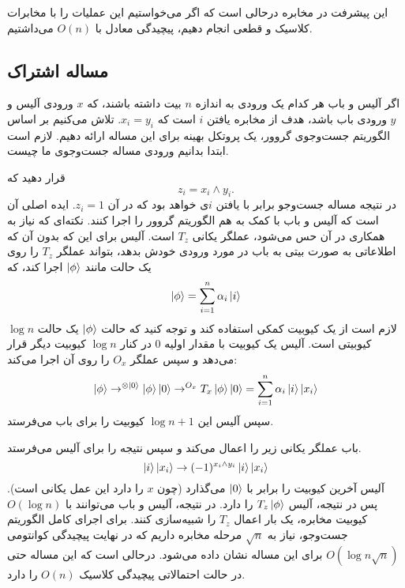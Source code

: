  این پیشرفت در مخابره درحالی است که اگر می‌خواستیم این عملیات را با مخابرات کلاسیک و قطعی انجام دهیم، پیچیدگی معادل با $O(n)$ می‌داشتیم. 
 
 
  \subsection{مساله اشتراک}

  اگر آلیس و باب هر کدام یک ورودی به اندازه $n$ بیت داشته باشند، که $x$ ورودی آلیس و $y$ ورودی باب باشد، هدف از مخابره یافتن $i$ است که $x_{i} = y_{i}$. تلاش می‌کنیم بر اساس الگوریتم جست‌وجوی گروور، یک پروتکل بهینه برای این مساله ارائه دهیم. 
  \cite{cleve98}
  لازم است ابتدا بدانیم ورودی مساله جست‌وجوی ما چیست.
  
    قرار دهید که 
  \begin{equation}
  	z_{i} = x_{i} \wedge y_{i}.
  \end{equation}
   در نتیجه مساله جست‌وجو برابر با یافتن $i$ی خواهد بود که در آن
    $z_{i} = 1$.
   ایده اصلی آن است که آلیس و باب با کمک به هم الگوریتم گروور را اجرا کنند. نکته‌ای که نیاز به همکاری در آن حس می‌شود، عملگر یکانی $T_{z}$ است. آلیس برای این که بدون آن که اطلاعاتی به صورت بیتی به باب در مورد ورودی خودش بدهد، بتواند عملگر $T_{z}$ را روی یک حالت مانند $\ket{\phi}$ اجرا کند، که 
    \begin{equation}
    	\ket{\phi} = \sum_{i=1}^{n} \alpha_{i}\ket{i}
    \end{equation}
    لازم است از یک کیوبیت کمکی استفاده کند و توجه کنید که حالت $\ket{\phi}$ یک حالت $\log{n}$ کیوبیتی است. آلیس یک کیوبیت با مقدار اولیه $0$ در کنار $\log{n}$ کیوبیت دیگر قرار می‌دهد و سپس عملگر $O_{x}$ را روی آن اجرا می‌کند:
    \begin{equation}
    \ket{\phi} \to^{ \otimes \ket{0}} \ket{\phi}\ket{0} \to^{O_{x}} T_{x}\ket{\phi}\ket{0} = \sum_{i=1}^{n} \alpha_{i}\ket{i}\ket{x_{i}}
    \end{equation}
    سپس آلیس این
     $\log{n} + 1$ کیوبیت را برای باب می‌فرستد. 
    
    باب عملگر یکانی زیر را اعمال می‌کند و سپس نتیجه را برای آلیس می‌فرستد. 
    \begin{equation}
    	\ket{i}\ket{x_{i}} \to (-1)^{x_{i}\wedge y_{i}}\ket{i}\ket{x_{i}}
    \end{equation}
    آلیس آخرین کیوبیت را برابر با $\ket{0}$ می‌گذارد (چون $x$ را دارد این عمل یکانی است). پس در نتیجه، آلیس $T_{z}\ket{\phi}$ را دارد. در نتیجه، آلیس و باب می‌توانند با $O(\log{n})$ کیوبیت مخابره، یک بار اعمال $T_{z}$ را شبیه‌سازی کنند. برای اجرای کامل الگوریتم جست‌وجو، نیاز به $\sqrt{n}$ مرحله مخابره داریم که در نهایت پیچیدگی کوانتومی 
    $O(\log{n}\sqrt{n})$ برای این مساله نشان داده می‌شود. درحالی است که این مساله حتی در حالت احتمالاتی پیچیدگی کلاسیک $O(n)$ را دارد. 